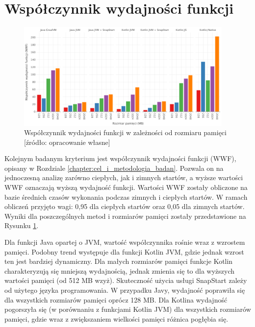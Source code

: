\section{Współczynnik wydajności funkcji}\label{chapter:results_wwf}

\begin{figure}[h]
    \centering
    \includegraphics[width=0.95\textwidth]{charts/results/wwf.png}
    \caption{Współczynnik wydajności funkcji w zależności od rozmiaru pamięci [źródło: opracowanie własne]}
    \label{fig:avg_wwf}
\end{figure}

Kolejnym badanym kryterium jest współczynnik wydajności funkcji (WWF), opisany w Rozdziale \ref{chapter:cel_i_metodologia_badan}.
Pozwala on na jednoczesną analizę zarówno ciepłych, jak i zimnych startów, a wyższe wartości WWF oznaczają wyższą wydajność funkcji.
Wartości WWF zostały obliczone na bazie średnich czasów wykonania podczas zimnych i ciepłych startów.
W ramach obliczeń przyjęto wagi: 0,95 dla ciepłych startów oraz 0,05 dla zimnych startów.
Wyniki dla poszczególnych metod i rozmiarów pamięci zostały przedstawione na Rysunku \ref{fig:avg_wwf}.

Dla funkcji Java opartej o JVM, wartość współczynnika rośnie wraz z wzrostem pamięci.
Podobny trend występuje dla funkcji Kotlin JVM, gdzie jednak wzrost ten jest bardziej dynamiczny.
Dla małych rozmiarów pamięci funkcje Kotlin charakteryzują się mniejszą wydajnością, jednak zmienia się to dla wyższych wartości pamięci (od 512 MB wzyż).
Skuteczność użycia usługi SnapStart zależy od użytego języka programowania.
W przypadku Javy, wydajność poprawiła się dla wszystkich rozmiarów pamięci oprócz 128 MB. 
Dla Kotlina wydajność pogorszyła się (w porównaniu z funkcjami Kotlin JVM) dla wszystkich rozmiarów pamięci, gdzie wraz z zwiększaniem wielkości pamięci różnica pogłębia się.

